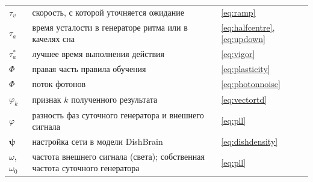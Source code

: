 \begin{center}
\begin{longtable}{>{\raggedright}p{2.0cm}>{\raggedright}p{9.6cm}>{\raggedright\arraybackslash}p{2.4cm}}
$\tau_v$ & скорость, с которой уточняется ожидание & \eqref{eq:ramp} \\
$\tau_a$ & время усталости в генераторе ритма или в качелях сна & \eqref{eq:halfcentre}, \eqref{eq:updown} \\
$\tau_a^*$ & лучшее время выполнения действия & \eqref{eq:vigor} \\
$\Phi$ & правая часть правила обучения & \eqref{eq:plasticity} \\
$\Phi$ & поток фотонов & \eqref{eq:photonnoise} \\
$\varphi_k$ & признак $k$ полученного результата & \eqref{eq:vectortd} \\
$\varphi$ & разность фаз суточного генератора и внешнего сигнала & \eqref{eq:pll} \\
$\boldsymbol\psi$ & настройка сети в модели DishBrain & \eqref{eq:dishdensity} \\
$\omega$, $\omega_0$ & частота внешнего сигнала (света); собственная частота суточного генератора & \eqref{eq:pll} \\
\end{longtable}
\end{center}
